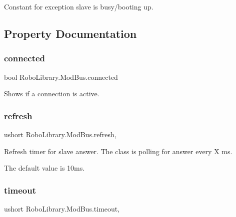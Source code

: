Constant for exception slave is busy/booting up.



\subsection{Property Documentation}
\hypertarget{class_robo_library_1_1_mod_bus_ab5a2fb9411e2257f48dd80672326fac1}{}\label{class_robo_library_1_1_mod_bus_ab5a2fb9411e2257f48dd80672326fac1} 
\subsubsection{\texorpdfstring{connected}{connected}}
{\footnotesize\ttfamily bool Robo\+Library.\+Mod\+Bus.\+connected\hspace{0.3cm}{\ttfamily [get]}}



Shows if a connection is active.

\hypertarget{class_robo_library_1_1_mod_bus_a4043bd356bda6e89fd95247956b0708c}{}\label{class_robo_library_1_1_mod_bus_a4043bd356bda6e89fd95247956b0708c} 
\subsubsection{\texorpdfstring{refresh}{refresh}}
{\footnotesize\ttfamily ushort Robo\+Library.\+Mod\+Bus.\+refresh\hspace{0.3cm}{\ttfamily [get]}, {\ttfamily [set]}}



Refresh timer for slave answer. The class is polling for answer every X ms.

The default value is 10ms.\hypertarget{class_robo_library_1_1_mod_bus_a00b9ec8fc1d37c089ff1e2bee2f7a61a}{}\label{class_robo_library_1_1_mod_bus_a00b9ec8fc1d37c089ff1e2bee2f7a61a} 
\subsubsection{\texorpdfstring{timeout}{timeout}}
{\footnotesize\ttfamily ushort Robo\+Library.\+Mod\+Bus.\+timeout\hspace{0.3cm}{\ttfamily [get]}, {\ttfamily [set]}}



